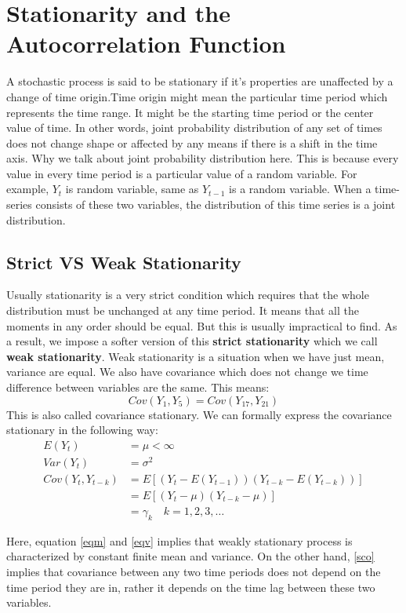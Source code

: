 \documentclass{book}
\begin{document}
\section{Stationarity and the Autocorrelation Function}
A stochastic process is said to be stationary if it's properties are unaffected by a change of time origin.Time origin might mean the particular time period which represents the time range. It might be the starting time period or the center value of time. In other words, joint probability distribution of any set of times does not change shape or affected by any means if there is a shift in the time axis. Why we talk about joint probability distribution here. This is because every value in every time period is a particular value of a random variable. For example, $Y_t$ is random variable, same as $Y_{t-1}$ is a random variable. When a time-series consists of these two variables, the distribution of this time series is a joint distribution.
\subsection{Strict VS Weak Stationarity}
Usually stationarity is a very strict condition which requires that the whole distribution must be unchanged at any time period. It means that all the moments in any order should be equal. But this is usually impractical to find. As a result, we impose a softer version of this \textbf{strict stationarity} which we call \textbf{weak stationarity}. Weak stationarity is a situation when we have just mean, variance are equal. We also have covariance which does not change we time difference between variables are the same. This means:
		\begin{equation}
			Cov(Y_1,Y_5)=Cov(Y_{17},Y_{21})
			\label{eqeqcov}
		\end{equation}
 This is also called covariance stationary. We can formally express the covariance stationary in the following way:
 		\begin{align}
			E(Y_t)&=\mu < \infty \label{eqm}\\ 
			Var(Y_t)&=\sigma^2 \label{eqv}\\
			Cov(Y_t,Y_{t-k})&=E[(Y_t-E(Y_{t-1}))(Y_{t-k}-E(Y_{t-k}))] \\ 
			&=E[(Y_t-\mu)(Y_{t-k}-\mu)]\\
			&=\gamma_k \label{sco} \quad k=1,2,3,\dotsc
		\end{align}

		Here, equation \eqref{eqm} and \eqref{eqv} implies that weakly stationary process is characterized by constant finite mean and variance. On the other hand, \eqref{sco} implies that covariance between any two time periods does not depend on the time period they are in, rather it depends on the time lag between these two variables. 
\end{document}

